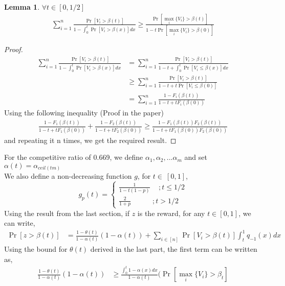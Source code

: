 \documentclass[12pt, letterpaper, twoside]{article}
\newtheorem{lemma}[theorem]{Lemma}
\begin{document}
\begin{lemma}
$\forall t \in [0,1/2]$
	\begin{align*}
		\sum_{i=1}^{n} \frac{\Pr[V_{i}>\beta(t)]}{1-\int_{0}^{t} \Pr[V_{i}>\beta(x)] dx} \geq \frac{\Pr[\max_{i} \{V_{i}\} > \beta(t)]}{1-t\Pr[\max_{i} \{V_{i}\} > \beta(0)]}
	\end{align*}
\end{lemma}
	\begin{proof}
		\begin{align*}
			\sum_{i=1}^{n} \frac{\Pr[V_{i}>\beta(t)]}{1-\int_{0}^{t} \Pr[V_{i}>\beta(x)] dx} &= \sum_{i=1}^{n} \frac{\Pr[V_{i}>\beta(t)]}{1-t+\int_{0}^{t} \Pr[V_{i}\leq\beta(x)] dx}\\
			&\geq \sum_{i=1}^{n} \frac{\Pr[V_{i}>\beta(t)]}{1-t+t\Pr[V_{i}\leq\beta(0)]}\\
			&=\sum_{i=1}^{n} \frac{1-F_{i}(\beta(t))}{1-t+tF_{i}(\beta(0))}
		\end{align*}
		Using the following inequality	 (Proof in the paper)
		\begin{align*} 
			\frac{1-F_{1}(\beta(t))}{1-t+tF_{1}(\beta(0))} + \frac{1-F_{2}(\beta(t))}{1-t+tF_{2}(\beta(0))} \geq \frac{1-F_{1}(\beta(t))F_{2}(\beta(t))}{1-t+tF_{1}(\beta(0))F_{2}(\beta(0))} 
		\end{align*}  
		and repeating it n times, we get the required result.
	\end{proof}
	For the competitive ratio of 0.669, we define $\alpha_{1}, \alpha_{2},...\alpha_{m}$ and set $\alpha(t) = \alpha_{ceil(tm)}$\\
	We also define a non-decreasing function $g$, for $t \in\ [0,1]$,
	$$g_{p}(t) = \begin{cases}
	\frac{1}{1-t(1-p)}  \quad \,; t \leq 1/2 \\
	\frac{2}{1+p} \quad \quad \quad; t > 1/2
	\end{cases}
	$$
	Using the result from the last section, if $z$ is the reward, for any $t \in [0,1]$, we can write,\\
	\begin{align*}
		\Pr[z > \beta(t)] &= \frac{1-\theta(t)}{1-\alpha(t)} (1-\alpha(t)) + \sum_{i \in [n]} \Pr[V_{i} > \beta(t)] \int_{t}^{1} q_{-1}(x) dx
	\end{align*}
	Using the bound for $\theta(t)$ derived in the last part, the first term can be written as,
	\begin{align*}
		\frac{1-\theta(t)}{1-\alpha(t)} (1-\alpha(t)) &\geq \frac{\int_{0}^{t} 1 - \alpha(x) dx}{1-\alpha(t)} (\Pr[\max_{i} \{V_{i}\} > \beta_{t}]
	\end{align*}
\end{document}
